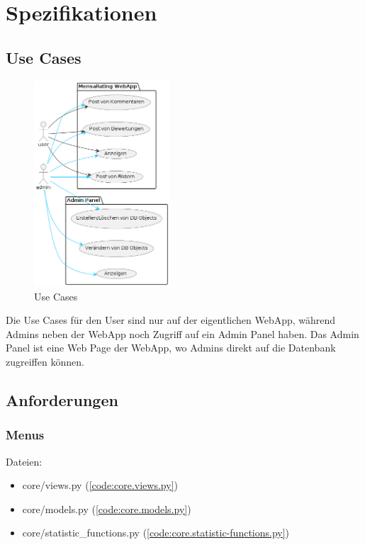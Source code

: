 \chapter{Spezifikationen}

\section{Use Cases} \label{sec:UseCases}
\begin{figure}[ht!]
    \centering
    \includegraphics[width=0.45\textwidth]{images/Use Case.png}
    \caption{Use Cases}
    \label{fig:UseCases}
\end{figure}

Die Use Cases für den User sind nur auf der eigentlichen WebApp, während Admins
neben der WebApp noch Zugriff auf ein Admin Panel haben. Das Admin Panel ist
eine Web Page der WebApp, wo Admins direkt auf die Datenbank zugreiffen können.



\newpage

\section{Anforderungen} \label{sec:Anforderungen}
\subsection{Menus} \label{spez:Menus}

Dateien:
\begin{itemize}
    \item core/views.py (\ref{code:core.views.py})
    \item core/models.py (\ref{code:core.models.py})
    \item core/statistic\_functions.py (\ref{code:core.statistic-functions.py})
\end{itemize}

